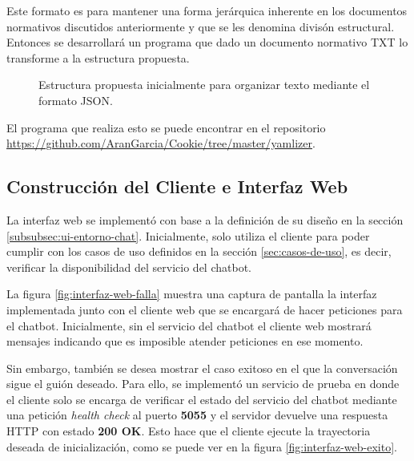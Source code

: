 Este formato es para mantener una forma jerárquica inherente en los documentos normativos discutidos anteriormente y que se les denomina divisón estructural. Entonces se desarrollará un programa que dado un documento normativo TXT lo transforme a la estructura propuesta.

\begin{figure}
    \centering
    
    \caption{Estructura propuesta inicialmente para organizar texto mediante el formato JSON.}
    \label{fig:estructura_propuesta}
\end{figure}

El programa que realiza esto se puede encontrar en el repositorio \url{https://github.com/AranGarcia/Cookie/tree/master/yamlizer}.



\subsection{Construcción del Cliente e Interfaz Web}

La interfaz web se implementó con base a la definición de su diseño en la sección \ref{subsubsec:ui-entorno-chat}. Inicialmente, solo utiliza el cliente para poder cumplir con los casos de uso definidos en la sección \ref{sec:casos-de-uso}, es decir, verificar la disponibilidad del servicio del chatbot.

La figura \ref{fig:interfaz-web-falla} muestra una captura de pantalla la interfaz implementada junto con el cliente web que se encargará de hacer peticiones para el chatbot. Inicialmente, sin el servicio del chatbot el cliente web mostrará mensajes indicando que es imposible atender peticiones en ese momento.

Sin embargo, también se desea mostrar el caso exitoso en el que la conversación sigue el guión deseado. Para ello, se implementó un servicio de prueba en donde el cliente solo se encarga de verificar el estado del servicio del chatbot mediante una petición \textit{health check} al puerto \textbf{5055} y el servidor devuelve una respuesta HTTP con estado \textbf{200 OK}. Esto hace que el cliente ejecute la trayectoria deseada de inicialización, como se puede ver en la figura \ref{fig:interfaz-web-exito}.

